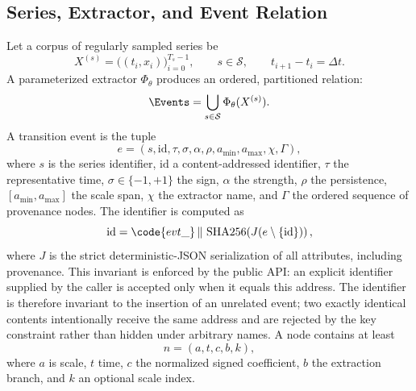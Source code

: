 \subsection{Series, Extractor, and Event Relation}

Let a corpus of regularly sampled series be
\begin{equation}
X^{(s)}=\bigl((t_i,x_i)\bigr)_{i=0}^{T_s-1},
\qquad s\in\mathcal{S},
\qquad t_{i+1}-t_i=\Delta t.
\end{equation}
A parameterized extractor $\Phi_{\theta}$ produces an ordered, partitioned relation:
\begin{equation}
\Events=\bigcup_{s\in\mathcal{S}}\Phi_{\theta}(X^{(s)}).
\end{equation}
A transition event is the tuple
\begin{equation}
 e=(s,\mathrm{id},\tau,\sigma,\alpha,\rho,a_{\min},a_{\max},\chi,\Gamma),
\end{equation}
where $s$ is the series identifier, $\mathrm{id}$ a content-addressed identifier, $\tau$ the representative time, $\sigma\in\{-1,+1\}$ the sign, $\alpha$ the strength, $\rho$ the persistence, $[a_{\min},a_{\max}]$ the scale span, $\chi$ the extractor name, and $\Gamma$ the ordered sequence of provenance nodes. The identifier is computed as
\begin{equation}
 \mathrm{id}=\code{evt\_}\,\Vert\,\operatorname{SHA256}\!\left(J(e\setminus\{\mathrm{id}\})\right),
\end{equation}
where $J$ is the strict deterministic-JSON serialization of all attributes, including provenance. This invariant is enforced by the public API: an explicit identifier supplied by the caller is accepted only when it equals this address. The identifier is therefore invariant to the insertion of an unrelated event; two exactly identical contents intentionally receive the same address and are rejected by the key constraint rather than hidden under arbitrary names. A node contains at least
\begin{equation}
 n=(a,t,c,b,k),
\end{equation}
where $a$ is scale, $t$ time, $c$ the normalized signed coefficient, $b$ the extraction branch, and $k$ an optional scale index.

